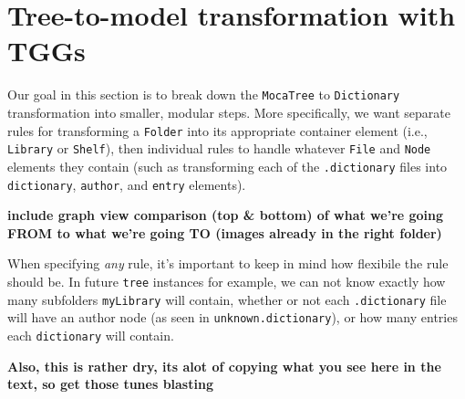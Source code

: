 \newpage
\section{Tree-to-model transformation with TGGs}
\genHeader

Our goal in this section is to break down the \texttt{MocaTree} to \texttt{Dictionary} transformation into smaller, modular steps. More specifically, we
want separate rules for transforming a \texttt{Folder} into its appropriate container element (i.e., \texttt{Library} or \texttt{Shelf}), then individual rules
to handle whatever \texttt{File} and \texttt{Node} elements they contain (such as transforming each of the \texttt{.dictionary} files into \texttt{dictionary},
\texttt{author}, and \texttt{entry} elements).

{\bf include graph view comparison (top \& bottom) of what we're going FROM to what we're going TO (images already in the right folder)}

When specifying \emph{any} rule, it's important to keep in mind how flexibile the rule should be. In future \texttt{tree} instances for example, we
can not know exactly how many subfolders \texttt{myLibrary} will contain, whether or not each \texttt{.dictionary} file will have an author node (as
seen in \texttt{unknown.dictionary}), or how many entries each \texttt{dictionary} will contain. 

{\bf Also, this is rather dry, its alot of copying what you see here in the text, so get those tunes blasting}








